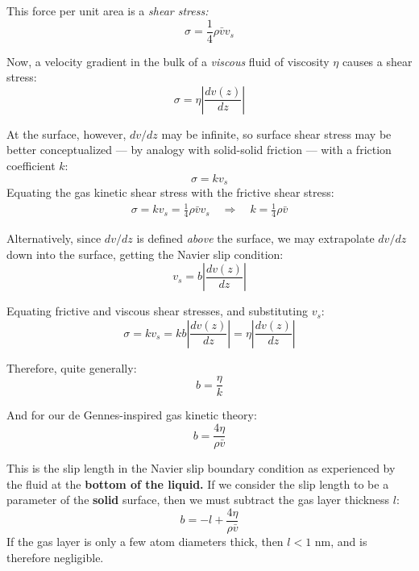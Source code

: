 \documentclass[a4paper]{report}
\begin{document}
This force per unit area is a \emph{shear stress:}
\begin{equation}
 \sigma = \frac{1}{4} \rho \bar{v} v_{s}
\end{equation}

Now, a velocity gradient in the bulk of a \emph{viscous} fluid of viscosity $\eta$ causes a shear stress:
\begin{equation}
\sigma = \eta \left| \frac{dv(z)}{dz} \right|
\end{equation}

At the surface, however, $dv/dz$ may be infinite, so surface shear stress may be better conceptualized --- by analogy with solid-solid friction --- with a friction coefficient $k$:
\begin{equation}
 \sigma = k v_{s}
\end{equation}
Equating the gas kinetic shear stress with the frictive shear stress:
\begin{gather}
\sigma = k v_{s} = \frac{1}{4} \rho \bar{v} v_{s} \quad \Rightarrow \quad
 k = \frac{1}{4} \rho \bar{v}
\end{gather}

Alternatively, since $dv/dz$ is defined \emph{above} the surface, we may extrapolate $dv/dz$ down into the surface, getting the Navier slip condition:
\begin{equation}
v_{s} = b \left| \frac{dv(z)}{dz} \right|
\end{equation}

Equating frictive and viscous shear stresses, and substituting $v_{s}$:
\begin{equation}
\sigma = k v_{s} = k b \left| \frac{dv(z)}{dz} \right| = \eta \left| \frac{dv(z)}{dz} \right|
\end{equation}

Therefore, quite generally:
\begin{equation}
 b = \frac{\eta}{k}
\end{equation}

And for our de Gennes-inspired gas kinetic theory:
\begin{equation}
b = \frac{4 \eta}{\rho \bar{v}}
\end{equation}

This is the slip length in the Navier slip boundary condition as experienced by the fluid at the \textbf{bottom of the liquid.}  If we consider the slip length to be a parameter of the \textbf{solid} surface, then we must subtract the gas layer thickness $l$:
\begin{equation}
b = -l + \frac{4 \eta}{\rho \bar{v}}
\end{equation}
If the gas layer is only a few atom diameters thick, then $l < 1$ nm, and is therefore negligible.
\end{document}
